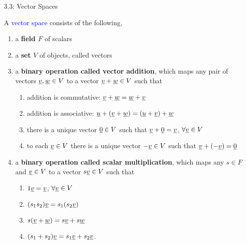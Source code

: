 \documentclass[10pt,letterpaper,english]{beamer}
\begin{document}
\begin{frame}{3.3: Vector Spaces}

\begin{definition} 
A \textcolor{blue}{vector space} consists of the following,
\begin{enumerate}
\item a {\bf \boldmath field $F$} of scalars
\item a {\bf \boldmath set $V$} of objects, called vectors
\item a \textbf{binary operation called vector addition}, which maps any pair of vectors $\underline{v}, \underline{w} \in V$ to a vector $\underline{v} + \underline{w} \in V$ such that
\begin{enumerate}
\item addition is commutative: $\underline{v} + \underline{w} = \underline{w} + \underline{v}$
\item addition is associative: $\underline{u} + (\underline{v} + \underline{w}) = (\underline{u} + \underline{v}) + \underline{w}$
\item there is a unique vector $\underline{0} \in V$ such that $\underline{v} + \underline{0} = \underline{v}$, $\forall \underline{v} \in V$
\item to each $\underline{v} \in V$ there is a unique vector $- \underline{v} \in V$ such that $\underline{v} + (- \underline{v}) = \underline{0}$
\end{enumerate}
\item a \textbf{binary operation called scalar multiplication}, which maps any $s \in F$ and $\underline{v} \in V$ to a vector $s \underline{v} \in V$ such that
\begin{enumerate}
\item $1 \underline{v} = \underline{v}$, $\forall \underline{v} \in V$
\item $(s_1 s_2) \underline{v} = s_1 ( s_2 \underline{v} )$
\item $s ( \underline{v} + \underline{w} ) = s \underline{v} + s \underline{w}$
\item $(s_1 + s_2) \underline{v} = s_1 \underline{v} + s_2 \underline{v}$.
\end{enumerate}
\end{enumerate}
\end{definition}

\end{frame}
\end{document}
